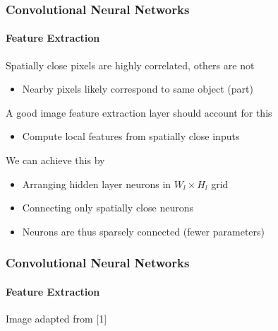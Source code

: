 \documentclass[xetex,professionalfont]{beamer}
\renewcommand\emph[1]{\textcolor{tuwcvl_cvl_blue}{#1}}
\begin{document}
\begin{frame}
\frametitle{Convolutional Neural Networks}
\framesubtitle{Feature Extraction}

Spatially close pixels are highly correlated, others are not
\begin{itemize}
    \item Nearby pixels likely correspond to same object (part)
\end{itemize}

\bigskip

A good image feature extraction layer should account for this
\begin{itemize}
    \item Compute \emph{local features} from spatially close inputs %
\end{itemize}

\bigskip

We can achieve this by
\begin{itemize}
    \item Arranging hidden layer neurons in $W_l\times H_l$ grid
    \item Connecting only spatially close neurons %
    \item Neurons are thus \emph{sparsely connected} (fewer parameters)
\end{itemize}

\end{frame}


\begin{frame}
\frametitle{Convolutional Neural Networks}
\framesubtitle{Feature Extraction}

\begin{center}
    {\centering Image adapted from [1]}
\end{center}

\end{frame}
\end{document}
